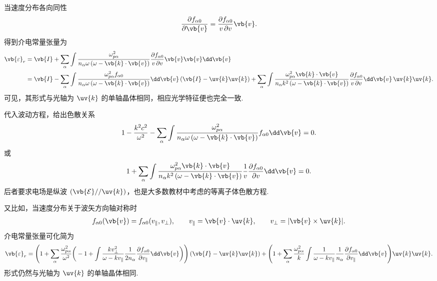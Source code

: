 \begin{exbox}
	当速度分布各向同性
	\begin{align*}
		\frac{\partial f_{\alpha0}}{\partial\vb{v}} = \frac{\partial f_{\alpha0}}{v \,\partial v}\vb{v}.
	\end{align*}
	得到介电常量张量为
	\begin{align*}
		\vb{\varepsilon}_r &= \vb{I} + \sum_\alpha\int\frac{\omega_{p\alpha}^2}{n_\alpha\omega\left(\omega-\vb{k}\cdot\vb{v}\right)}\frac{\partial f_{\alpha0}}{v\,\partial v}\vb{v}\vb{v}\dd \vb{v}\\
		&= \vb{I} - \sum_\alpha\int\frac{\omega_{p\alpha}^2f_{\alpha0}}{n_\alpha\omega\left(\omega-\vb{k}\cdot\vb{v}\right)}\dd \vb{v}\left(\vb{I}-\uv{k}\uv{k}\right) + \sum_\alpha\int\frac{\omega_{p\alpha}^2\vb{k}\cdot\vb{v}}{n_\alpha k^2\left(\omega-\vb{k}\cdot\vb{v}\right)}\frac{\partial f_{\alpha0}}{v\,\partial v}\dd \vb{v}\,\uv{k}\uv{k}.
	\end{align*}
	可见，其形式与光轴为 \(\uv{k}\) 的单轴晶体相同，相应光学特征便也完全一致.

	代入波动方程，给出色散关系
	\begin{align*}
		1 - \frac{k^2c^2}{\omega^2} - \sum_\alpha\int\frac{\omega_{p\alpha}^2}{n_\alpha\omega\left(\omega-\vb{k}\cdot\vb{v}\right)}f_{\alpha0}\dd \vb{v} = 0.
	\end{align*}
	或
	\begin{align*}
		1 + \sum_\alpha\int\frac{\omega_{p\alpha}^2\vb{k}\cdot\vb{v}}{n_\alpha k^2\left(\omega-\vb{k}\cdot\vb{v}\right)}\frac{1}{v}\frac{\partial f_{\alpha0}}{\partial v}\dd \vb{v} = 0.
	\end{align*}
	后者要求电场是纵波 \(\left(\vb{\mathcal{E}}//\uv{k}\right)\)，也是大多数教材中考虑的等离子体色散方程.

	又比如，当速度分布关于波矢方向轴对称时
	\begin{align*}
		f_{\alpha0}(\vb{v})=f_{\alpha0}(v_{\parallel},v_\perp),\qquad v_{\parallel}=\vb{v}\cdot\uv{k},\qquad v_\perp=|\vb{v}\times\uv{k}|.
	\end{align*}
	介电常量张量可化简为
	\begin{align*}
		\vb{\varepsilon}_r = \Bigg(1 + \sum_\alpha\frac{\omega_{p\alpha}^2}{\omega^2}\bigg(-1 + \int\frac{k v_\perp^2}{\omega-k v_{\parallel}}\frac{1}{2n_\alpha}\frac{\partial f_{\alpha0}}{\partial v_{\parallel}}\dd \vb{v}\bigg)\Bigg)\left(\vb{I}-\uv{k}\uv{k}\right) + \Bigg(1 + \sum_\alpha\frac{\omega_{p\alpha}^2}{k}\int\frac{1}{\omega-k v_{\parallel}}\frac{1}{n_\alpha}\frac{\partial f_{\alpha0}}{\partial v_{\parallel}}\dd \vb{v}\Bigg)\uv{k}\uv{k}.
	\end{align*}
	形式仍然与光轴为 \(\uv{k}\) 的单轴晶体相同.


\end{exbox}
